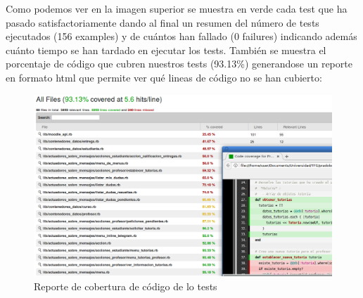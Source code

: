 Como podemos ver en la imagen superior se muestra en verde cada test que ha pasado satisfactoriamente dando al final un resumen del número de tests ejecutados (156 examples) y de cuántos han fallado (0 failures) indicando además cuánto tiempo se han tardado en ejecutar los tests. También se muestra el porcentaje de código que cubren nuestros tests (93.13\%) generandose un reporte en formato html que permite ver qué lineas de código no se han cubierto:

\begin{figure}[H] %
\centering
\includegraphics[scale=0.3]{imagenes/random/Screenshot_2017-09-05_14-47-08.png}  %

\caption{Reporte de cobertura de código de lo tests}\label{figura94}

\end{figure}

